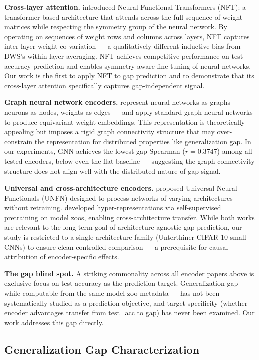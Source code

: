 \textbf{Cross-layer attention.} \citet{zhou2023} introduced Neural Functional Transformers (NFT): a
transformer-based architecture that attends across the full sequence of weight matrices while respecting
the symmetry group of the neural network. By operating on sequences of weight rows and columns across
layers, NFT captures inter-layer weight co-variation --- a qualitatively different inductive bias from
DWS's within-layer averaging. NFT achieves competitive performance on test accuracy prediction and
enables symmetry-aware fine-tuning of neural networks. Our work is the first to apply NFT to gap
prediction and to demonstrate that its cross-layer attention specifically captures gap-independent signal.

\textbf{Graph neural network encoders.} \citet{kofinas2024} represent neural networks as graphs --- neurons
as nodes, weights as edges --- and apply standard graph neural networks to produce equivariant weight
embeddings. This representation is theoretically appealing but imposes a rigid graph connectivity
structure that may over-constrain the representation for distributed properties like generalization gap.
In our experiments, GNN achieves the lowest gap Spearman ($r = 0.3747$) among all tested encoders,
below even the flat baseline --- suggesting the graph connectivity structure does not align well with
the distributed nature of gap signal.

\textbf{Universal and cross-architecture encoders.} \citet{trabucco2024} proposed Universal Neural
Functionals (UNFN) designed to process networks of varying architectures without retraining. \citet{schurholt2022hyper}
developed hyper-representations via self-supervised pretraining on model zoos, enabling
cross-architecture transfer. While both works are relevant to the long-term goal of architecture-agnostic
gap prediction, our study is restricted to a single architecture family (Unterthiner CIFAR-10 small CNNs)
to ensure clean controlled comparison --- a prerequisite for causal attribution of encoder-specific effects.

\textbf{The gap blind spot.} A striking commonality across all encoder papers above is exclusive focus on
test accuracy as the prediction target. Generalization gap --- while computable from the same model zoo
metadata --- has not been systematically studied as a prediction objective, and target-specificity
(whether encoder advantages transfer from test\_acc to gap) has never been examined. Our work addresses
this gap directly.

\subsection{Generalization Gap Characterization}

